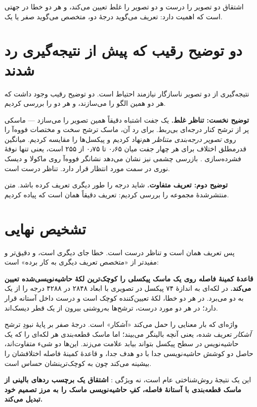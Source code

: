 اشتقاق دو تصویر را درست و دو تصویر را غلط تعیین می‌کند، و هر دو خطا در جهتی است که اهمیت دارد:
تعریف می‌گوید درجهٔ دو، متخصص می‌گوید صفر یا یک.

\section{دو توضیح رقیب که پیش از نتیجه‌گیری رد شدند}

نتیجه‌گیری از دو تصویر ناسازگار نیازمند احتیاط است. دو توضیح رقیب وجود داشت که هر دو همین
الگو را می‌سازند، و هر دو را بررسی کردیم.

\textbf{توضیح نخست: تناظر غلط.} یک جفت اشتباه دقیقاً همین تصویر را می‌سازد — ماسکی پر از ترشح
کنار درجه‌ای بی‌ربط. برای رد آن، ماسک ترشح سخت و مختصات فووه‌آ را روی \emph{تصویر درجه‌بندی
متناظر} هم‌نهاد کردیم و پیکسل‌ها را مقایسه کردیم. میانگین قدرمطلق اختلاف برای هر چهار جفت میان
\num{۰٫۶۵} تا \num{۰٫۷۵} از \num{۲۵۵} است، یعنی تنها نوفهٔ فشرده‌سازی . بازرسی چشمی نیز نشان می‌دهد نشانگر
فووه‌آ روی ماکولا و دیسک نوری در سمت مورد انتظار قرار دارد. تناظر درست است.

\textbf{توضیح دوم: تعریف متفاوت.} شاید  درجه را طور دیگری تعریف کرده باشد. متن منتشرشدهٔ
مجموعه را بررسی کردیم: تعریف دقیقاً همان است که پیاده کردیم.

\section{تشخیص نهایی}

پس تعریف همان است و تناظر درست است. خطا جای دیگری است، و دقیق‌تر و مفیدتر از «متخصص تعریف
دیگری به کار برده» است:

\textbf{قاعدهٔ کمینهٔ فاصله روی یک ماسک پیکسلی را کوچک‌ترین لکهٔ حاشیه‌نویسی‌شده تعیین می‌کند.}
در  لکه‌ای به اندازهٔ \num{۷۴} پیکسل در تصویری با ابعاد \num{۲۸۴۸} در \num{۴۲۸۸} درجه را از یک به دو
می‌برد. در هر دو خطا، لکهٔ تعیین‌کننده کوچک است و درست داخل آستانه قرار دارد؛ در هر دو مورد
درست، ترشح‌ها به‌روشنی بیرون از یک قطر دیسک‌اند.

واژه‌ای که بار معنایی را حمل می‌کند «آشکار» است. درجهٔ صفر بر پایهٔ نبودِ ترشح \emph{آشکار}
تعریف شده، یعنی آنچه بالینگر می‌بیند؛ اما ماسک قطعه‌بندی هر لکه‌ای را که یک حاشیه‌نویس در سطح
پیکسل بتواند بیابد علامت می‌زند. این‌ها دو شیء متفاوت‌اند، حاصل دو کوشش حاشیه‌نویسی جدا با دو
هدف جدا، و قاعدهٔ کمینهٔ فاصله اختلافشان را بیشینه می‌کند چون به کوچک‌ترینشان حساس است.

این یک نتیجهٔ روش‌شناختی عام است، نه ویژگی : \textbf{اشتقاق یک برچسب ردهای بالینی از
ماسک قطعه‌بندی با آستانهٔ فاصله، کفِ حاشیه‌نویسی ماسک را به مرز تصمیم خود تبدیل می‌کند.}

